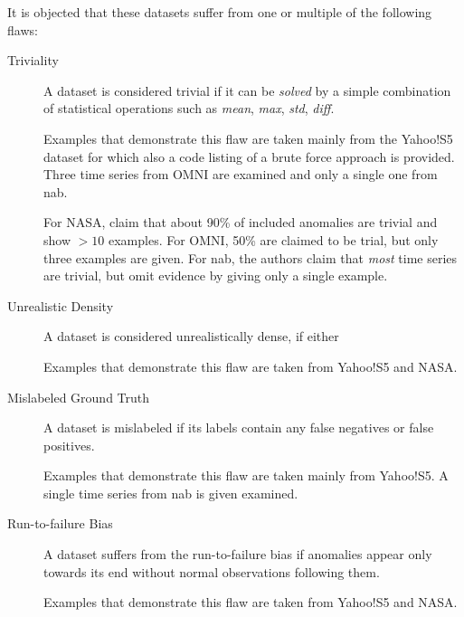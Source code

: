 It is objected that these datasets suffer from one or multiple of the following
flaws:
\begin{description}
    \item[Triviality] A dataset is considered trivial if it can be \textit{solved}
    by a simple combination of statistical operations such as \textit{mean},
    \textit{max}, \textit{std}, \textit{diff}.
    
    Examples that demonstrate this flaw are taken mainly from the Yahoo!S5 dataset
    for which also a code listing of a brute force approach is provided. Three
    time series from OMNI are examined and only a single one from \gls{nab}.
    
    For NASA, \textcite{Renjie.2020} claim that about 90\% of included anomalies
    are trivial and show \(>10\) examples. For OMNI, 50\% are claimed to be trial,
    but only three examples are given. For \gls{nab}, the authors claim that
    \textit{most} time series are trivial, but omit evidence by giving only a
    single example.

    \item[Unrealistic Density] A dataset is considered unrealistically dense, if
    either

    Examples that demonstrate this flaw are taken from Yahoo!S5 and NASA\@.

    \item[Mislabeled Ground Truth] A dataset is mislabeled if its labels contain
    any false negatives or false positives.

    Examples that demonstrate this flaw are taken mainly from Yahoo!S5. A single
    time series from \gls{nab} is given examined.

    \item[Run-to-failure Bias] A dataset suffers from the run-to-failure bias if
    anomalies appear only towards its end without normal observations following
    them.

    Examples that demonstrate this flaw are taken from Yahoo!S5 and NASA\@.
\end{description}

